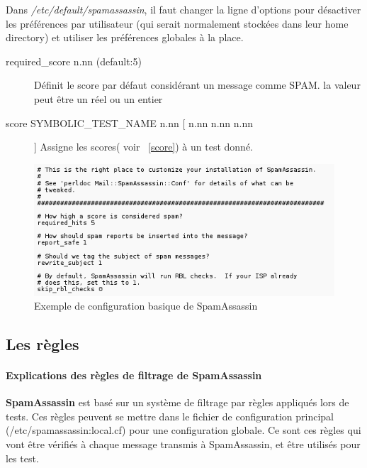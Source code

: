 \documentclass[a4paper,11pt]{article}
\begin{document}
\begin{description}
 \item [Désactiver les préférences utilisateurs]Dans \emph{/etc/default/spamassassin}, il faut changer la ligne d'options pour désactiver les préférences par utilisateur (qui serait normalement stockées dans leur home directory) et utiliser les préférences globales à la place. 
 \item [Options de score] \begin{description}
                           \item [required\_score n.nn (default:5)] Définit le score par défaut considérant un message comme SPAM. la valeur peut être un réel ou un entier
                           \item [score SYMBOLIC\_TEST\_NAME n.nn [ n.nn n.nn n.nn ]] Assigne les scores( voir ~\ref{score}) à un test donné.
                          \end{description}
\item 
\end{description}
\begin{figure}[h!t!]
 \centering
 \includegraphics[width=\textwidth]{./annexes/local_sample.png}
 \caption{Exemple de configuration basique de SpamAssassin}
 \label{fig:local_sample}
\end{figure}
\pagebreak
\subsection{Les règles}
\paragraph{Explications des règles de filtrage de SpamAssassin}
\textbf{SpamAssassin} est basé sur un système de filtrage par règles appliqués lors de tests. 
Ces règles peuvent se mettre dans le fichier de configuration principal (/etc/spamassassin:local.cf) pour 
une configuration globale.
Ce sont ces règles qui vont être vérifiés à chaque message transmis à SpamAssassin, et être utilisés pour les test.
\end{document}

